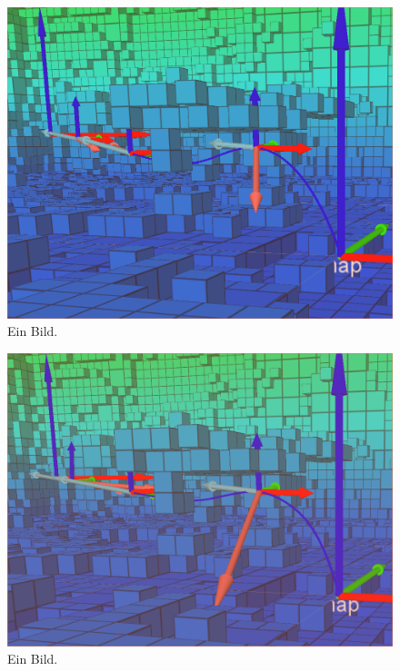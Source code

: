 \begin{figure}[h]
   \centering
   \includegraphics[width=1\textwidth]{pics/section_and_time.png}
   \caption{Ein Bild.}
\end{figure}


\begin{figure}[h]
   \centering
   \includegraphics[width=1\textwidth]{pics/Nlopt_after_sectionAndTime.png}
   \caption{Ein Bild.}
\end{figure}